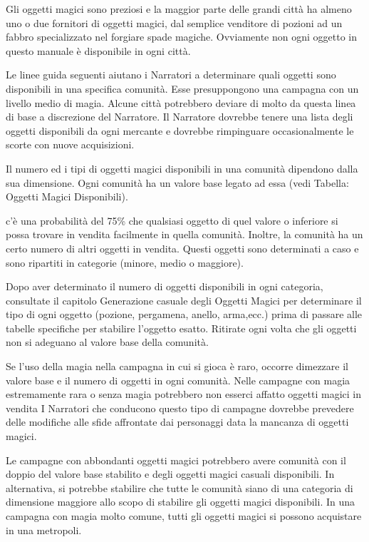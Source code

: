 \begin{multicols}{2}

\bigskip

Gli oggetti magici sono preziosi e la maggior parte delle grandi città ha almeno uno o due fornitori di oggetti magici, dal semplice venditore di pozioni ad un fabbro specializzato nel forgiare spade magiche. Ovviamente non ogni oggetto in questo manuale è disponibile in ogni città.

Le linee guida seguenti aiutano i Narratori a determinare quali oggetti sono disponibili in una specifica comunità. Esse presuppongono una campagna con un livello medio di magia. Alcune città potrebbero deviare di molto da questa linea di base a discrezione del Narratore. Il Narratore dovrebbe tenere una lista degli oggetti disponibili da ogni mercante e dovrebbe rimpinguare occasionalmente le scorte con nuove acquisizioni.

Il numero ed i tipi di oggetti magici disponibili in una comunità dipendono dalla sua dimensione. Ogni comunità ha un valore base legato ad essa (vedi Tabella: Oggetti Magici Disponibili).

c'è una probabilità del 75\% che qualsiasi oggetto di quel valore o inferiore si possa trovare in vendita facilmente in quella comunità. Inoltre, la comunità ha un certo numero di altri oggetti in vendita. Questi oggetti sono determinati a caso e sono ripartiti in categorie (minore, medio o maggiore).

Dopo aver determinato il numero di oggetti disponibili in ogni categoria, consultate il capitolo Generazione casuale degli Oggetti Magici per determinare il tipo di ogni oggetto (pozione, pergamena, anello, arma,ecc.) prima di passare alle tabelle specifiche per stabilire l'oggetto esatto. Ritirate ogni volta che gli oggetti non si adeguano al valore base della comunità.

Se l'uso della magia nella campagna in cui si gioca è raro, occorre dimezzare il valore base e il numero di oggetti in ogni comunità. Nelle campagne con magia estremamente rara o senza magia potrebbero non esserci affatto oggetti magici in vendita I Narratori che conducono questo tipo di campagne dovrebbe prevedere delle modifiche alle sfide affrontate dai personaggi data la mancanza di oggetti magici.

Le campagne con abbondanti oggetti magici potrebbero avere comunità con il doppio del valore base stabilito e degli oggetti magici casuali disponibili. In alternativa, si potrebbe stabilire che tutte le comunità siano di una categoria di dimensione maggiore allo scopo di stabilire gli oggetti magici disponibili. In una campagna con magia molto comune, tutti gli oggetti magici si possono acquistare in una metropoli.


\end{multicols}
